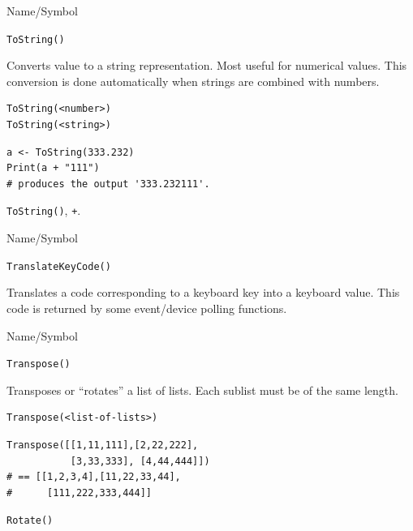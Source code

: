 \begin{desc}{Name/Symbol}
\item[Name/Symbol]  	\verb+ToString()+

\item[Description] Converts value to a string representation. Most
  useful for numerical values.  This conversion is done automatically
  when strings are combined with numbers.

\item[Usage]     
\begin{verbatim}
ToString(<number>)
ToString(<string>)
\end{verbatim}

\item[Example]
\begin{verbatim}
a <- ToString(333.232)
Print(a + "111")
# produces the output '333.232111'.
\end{verbatim}
		

\item[See Also] \verb+ToString()+, \verb|+|.
\end{desc}




\begin{desc}{Name/Symbol}
\item[Name/Symbol]  	\verb+TranslateKeyCode()+

\item[Description] Translates a code corresponding to a keyboard key
  into a keyboard value.  This code is returned by some event/device
  polling functions.

\item[Usage]		

\item[Example]	

\item[See Also]	
\end{desc}




\begin{desc}{Name/Symbol}
\item[Name/Symbol]  	\verb+Transpose()+

\item[Description] Transposes or ``rotates'' a list of lists.  Each
  sublist must be of the same length.

\item[Usage]       	
\begin{verbatim}
Transpose(<list-of-lists>)
\end{verbatim}

\item[Example]     	
\begin{verbatim}
Transpose([[1,11,111],[2,22,222],
           [3,33,333], [4,44,444]])
# == [[1,2,3,4],[11,22,33,44],
#      [111,222,333,444]]
\end{verbatim}

\item[See Also]    	\verb+Rotate()+
\end{desc}

